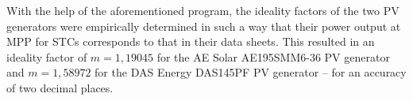 With the help of the aforementioned \MATLAB program, the ideality factors of the two PV generators were empirically determined in such a way that their power output at MPP for STCs corresponds to that in their data sheets. This resulted in an ideality factor of $m = 1,19045$ for the AE Solar AE195SMM6-36 PV generator and $m = 1,58972$ for the DAS Energy DAS145PF PV generator -- for an accuracy of two decimal places. 


 





